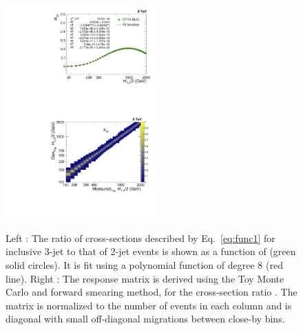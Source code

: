 \begin{figure}[!htbp]
 \begin{center}
 \hspace*{-5mm}\includegraphics[width=0.51\textwidth]{Plots_HT_2_150/Extrapolate_Theory_Ratio_32_funcII.pdf}%
 ~~\includegraphics[width=0.51\textwidth]{Plots_HT_2_150/Normalized_Response_Matrix_NLO_ratio_32_column_3.pdf}
 \caption[Left : The ratio of cross-sections for inclusive 3-jet to that of 2-jet events as a function of \httwo. Right : The response matrix is derived using the Toy Monte Carlo and forward smearing method, for the cross-section ratio \rations.]{Left : The ratio of cross-sections described by Eq.~\ref{eq:func1} for inclusive 3-jet to that of 2-jet events is shown as a function of \httwo (green solid circles). It is fit using a polynomial function of degree 8 (red line). Right : The response matrix is derived using the Toy Monte Carlo and forward smearing method, for the cross-section ratio \rations. The matrix is normalized to the number of events in each column and is diagonal with small off-diagonal migrations between close-by \httwo bins.}
 \label{fig:ratio_fit}
 \end{center}
\end{figure}

